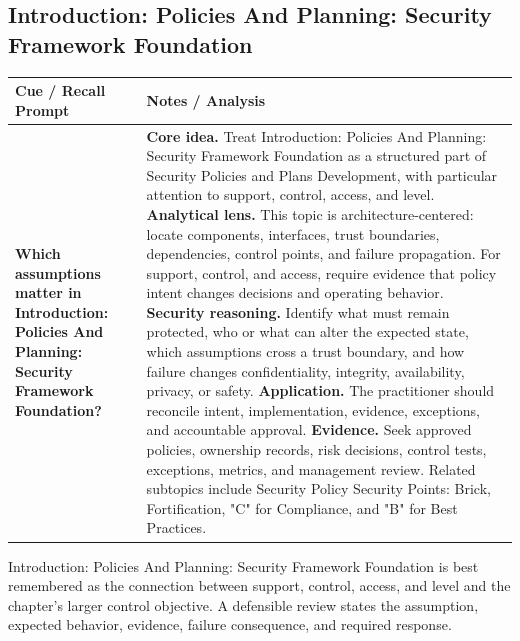 \documentclass[11pt]{article}
\newcommand{\CornellHeader}{%
\rowcolor{Navy}\color{white}\bfseries Cue / Recall Prompt & \color{white}\bfseries Notes / Analysis\\\hline}
\newcommand{\CornellRow}[2]{%
\cellcolor{CueGray}\RaggedRight\textbf{#1} & \RaggedRight #2\\\hline}
\begin{document}
\subsection*{Introduction: Policies And Planning: Security Framework Foundation}
\begin{longtable}{>{\RaggedRight\arraybackslash}p{}|>{\RaggedRight\arraybackslash}p{}}
\CornellHeader
\CornellRow{Which assumptions matter in Introduction: Policies And Planning: Security Framework Foundation?}{\textbf{Core idea.} Treat Introduction: Policies And Planning: Security Framework Foundation as a structured part of Security Policies and Plans Development, with particular attention to support, control, access, and level. \textbf{Analytical lens.} This topic is architecture-centered: locate components, interfaces, trust boundaries, dependencies, control points, and failure propagation. For support, control, and access, require evidence that policy intent changes decisions and operating behavior. \textbf{Security reasoning.} Identify what must remain protected, who or what can alter the expected state, which assumptions cross a trust boundary, and how failure changes confidentiality, integrity, availability, privacy, or safety. \textbf{Application.} The practitioner should reconcile intent, implementation, evidence, exceptions, and accountable approval. \textbf{Evidence.} Seek approved policies, ownership records, risk decisions, control tests, exceptions, metrics, and management review. Related subtopics include Security Policy Security Points: Brick, Fortification, "C" for Compliance, and "B" for Best Practices.}
\end{longtable}
\begin{topicsummary}
Introduction: Policies And Planning: Security Framework Foundation is best remembered as the connection between support, control, access, and level and the chapter's larger control objective. A defensible review states the assumption, expected behavior, evidence, failure consequence, and required response.
\end{topicsummary}
\end{document}
